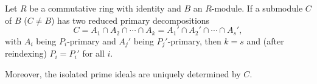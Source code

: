 Let $R$ be a commutative ring with identity and $B$ an $R$-module. If a submodule $C$ of $B$ ($C \neq B$) has two reduced primary decompositions
\[
C = A_1 \cap A_2 \cap \cdots \cap A_k = A_1' \cap A_2' \cap \cdots \cap A_s',
\]
with $A_i$ being $P_i$-primary and $A_j'$ being $P_j'$-primary, then $k = s$ and (after reindexing) $P_i = P_i'$ for all $i$.

Moreover, the isolated prime ideals are uniquely determined by $C$.
